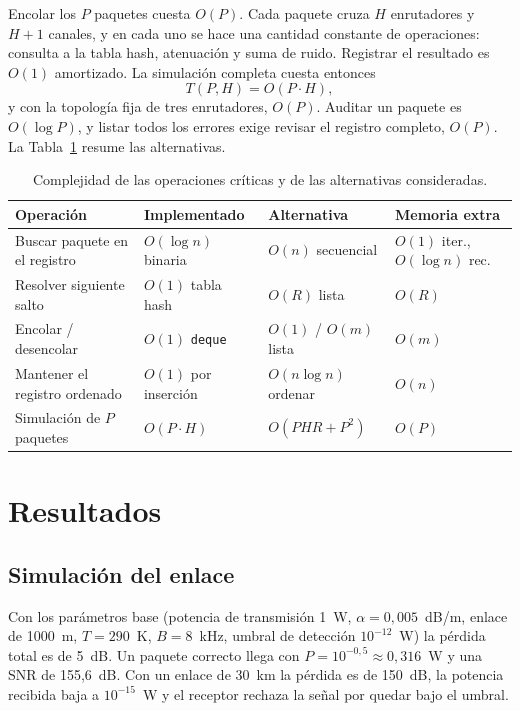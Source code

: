 \documentclass[11pt,a4paper]{article}
\begin{document}
Encolar los $P$ paquetes cuesta $O(P)$. Cada paquete cruza $H$ enrutadores y
$H+1$ canales, y en cada uno se hace una cantidad constante de operaciones:
consulta a la tabla hash, atenuación y suma de ruido. Registrar el resultado es
$O(1)$ amortizado. La simulación completa cuesta entonces
\begin{equation}
T(P, H) = O(P \cdot H),
\end{equation}
y con la topología fija de tres enrutadores, $O(P)$. Auditar un paquete es
$O(\log P)$, y listar todos los errores exige revisar el registro completo,
$O(P)$. La Tabla~\ref{tab:resumen} resume las alternativas.

\begin{table}[h]
\centering
\caption{Complejidad de las operaciones críticas y de las alternativas consideradas.}
\label{tab:resumen}
\small
\begin{tabular}{llll}
\toprule
Operación & Implementado & Alternativa & Memoria extra \\
\midrule
Buscar paquete en el registro & $O(\log n)$ binaria & $O(n)$ secuencial & $O(1)$ iter., $O(\log n)$ rec. \\
Resolver siguiente salto & $O(1)$ tabla hash & $O(R)$ lista & $O(R)$ \\
Encolar / desencolar & $O(1)$ \texttt{deque} & $O(1)$ / $O(m)$ lista & $O(m)$ \\
Mantener el registro ordenado & $O(1)$ por inserción & $O(n \log n)$ ordenar & $O(n)$ \\
Simulación de $P$ paquetes & $O(P \cdot H)$ & $O(P H R + P^2)$ & $O(P)$ \\
\bottomrule
\end{tabular}
\end{table}

\section{Resultados}

\subsection{Simulación del enlace}

Con los parámetros base (potencia de transmisión 1~W, $\alpha = 0{,}005$~dB/m,
enlace de 1000~m, $T = 290$~K, $B = 8$~kHz, umbral de detección
$10^{-12}$~W) la pérdida total es de 5~dB. Un paquete correcto llega con
$P = 10^{-0{,}5} \approx 0{,}316$~W y una SNR de 155{,}6~dB. Con un enlace de
30~km la pérdida es de 150~dB, la potencia recibida baja a $10^{-15}$~W y el
receptor rechaza la señal por quedar bajo el umbral.
\end{document}
